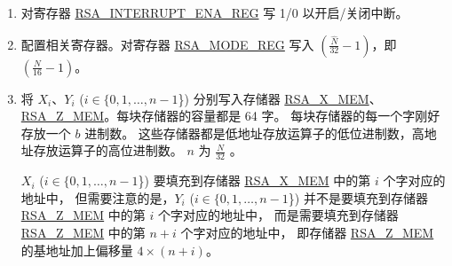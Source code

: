 \documentclass[main\_\_CN.tex]{subfiles}
\begin{document}
\begin{enumerate}

    \item 对寄存器 \hyperref[regdesc:RSAINTERRUPTENAREG]{RSA\_INTERRUPT\_ENA\_REG} 写 1/0 以开启/关闭中断。

    \item 配置相关寄存器。对寄存器 \hyperref[regdesc:RSAMODEXPMODEREG]{RSA\_MODE\_REG} 写入 \begin{math}( \frac{\hat{N}}{32} - 1 )\end{math}，即 \begin{math}(  \frac{N}{16} - 1 )\end{math}。

    \item 将 \begin{math}{X}_{i}\end{math}、\begin{math}{Y}_{i}\end{math} (\begin{math}i \in \{ 0, 1, \dots, n-1 \end{math}\}) 分别写入存储器 \hyperref[regdesc:RSAmemory]{RSA\_X\_MEM}、\hyperref[regdesc:RSAmemory]{RSA\_Z\_MEM}。每块存储器的容量都是 64 字。
        每块存储器的每一个字刚好存放一个 \begin{math}b\end{math} 进制数。
        这些存储器都是低地址存放运算子的低位进制数，高地址存放运算子的高位进制数。
        \begin{math}n\end{math} 为 \begin{math} \frac{N}{32} \end{math} 。

         \begin{math}{X}_{i}\end{math} (\begin{math}i \in \{ 0, 1, \dots, n-1 \end{math}\}) 要填充到存储器 \hyperref[regdesc:RSAmemory]{RSA\_X\_MEM} 中的第 \begin{math}i\end{math} 个字对应的地址中，
        但需要注意的是，\begin{math}{Y}_{i}\end{math} (\begin{math}i\in\{ 0, 1, \dots, n-1 \end{math}\}) 并不是要填充到存储器 \hyperref[regdesc:RSAmemory]{RSA\_Z\_MEM} 中的第 \begin{math}i\end{math} 个字对应的地址中，
        而是需要填充到存储器 \hyperref[regdesc:RSAmemory]{RSA\_Z\_MEM} 中的第 \begin{math}n+i\end{math} 个字对应的地址中，
        即存储器 \hyperref[regdesc:RSAmemory]{RSA\_Z\_MEM} 的基地址加上偏移量 \begin{math}4 \times (n+i) \end{math}。


\end{enumerate}
\end{document}
